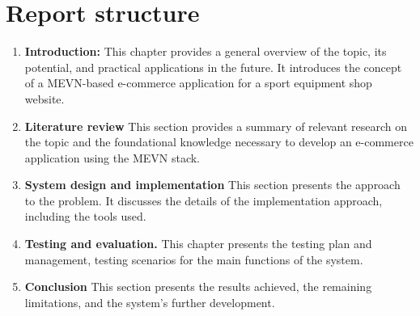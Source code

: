 \section{Report structure}
\begin{enumerate}[label=\bfseries Chapter \arabic*.,leftmargin=*]
    \item \textbf{Introduction:} This chapter provides a general overview of the topic, its potential, and practical applications in the future. It introduces the concept of a MEVN-based e-commerce application for a sport equipment shop website.
    \item \textbf{Literature review} This section provides a summary of relevant research on the topic and the foundational knowledge necessary to develop an e-commerce application using the MEVN stack.
    \item \textbf{System design and implementation} This section presents the approach to the problem. It discusses the details of the implementation approach, including the tools used.
    \item \textbf{Testing and evaluation.}  This chapter presents the testing plan and management, testing scenarios for the main functions of the system.
    \item \textbf{Conclusion} This section presents the results achieved, the remaining limitations, and the system’s further development.
\end{enumerate}


